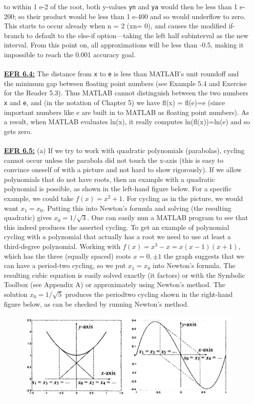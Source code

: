 \documentclass[../main.tex]{subfiles}
\begin{document}
to within 1 e-2 of the root, both y-values \texttt{yn} and \texttt{ya} would then be less than 1 e-200; so their product 
would be less than 1 e-400 and so would underflow to zero. This starts to occur already when n = 2 (xn= 0), and causes the modified if-branch to default to the else-if option—taking the left half subinterval 
as the new interval. From this point on, all approximations will be less than -0.5, making it impossible 
to reach the 0.001 accuracy goal.
\\
\\
\textbf{\underline{EFR 6.4:}} The distance from \texttt{x} to \texttt{e} is less than MATLAB's unit roundoff and the minimum gap 
between floating point numbers (see Example 5.4 and Exercise for the Reader 5.3). Thus MATLAB 
cannot distinguish between the two numbers \texttt{x} and \texttt{e}, and (in the notation of Chapter 5) we have fl(x) 
= fl(e)=e (since important numbers like e are built in to MATLAB as floating point numbers). As a 
result, when MATLAB evaluates ln(x), it really computes ln(fl(x))=ln(e) and so gets zero. 
\\
\\
\textbf{\underline{EFR 6.5:}} (a) If we try to work with quadratic polynomials (parabolas), cycling cannot occur unless 
the parabola did not touch the x-axis (this is easy to convince oneself of with a picture and not hard to 
show rigorously). If we allow polynomials that do not have roots, then an example with a quadratic 
polynomial is possible, as shown in the left-hand figure below. For a specific example, we could take $f(x)=x^{2}+1$. For cycling as in the picture, we would want $x_{1}=x_{0}$. Putting this into Newton's formula and solving (the resulting quadratic) gives $x_{0}=1 / \sqrt{3}$. One can easily nun a MATLAB program to see that this indeed produces the asserted cycling. To get an example of polynomial cycling with a polynomial that actually has a root we need to use at least a third-degree polynomial. Working with $f(x)=x^{3}-x=x(x-1)(x+1)$, which has the three (equally spaced) roots $x=0, \pm 1$ the graph suggests that we can have a period-two cycling, so we put $x_{1}=x_{0}$ into Newton's formula. The resulting cubic equation is easily solved exactly (it factors) or with the Symbolic Toolbox (see Appendix A) or approximately using Newton's method. The solution $x_{0}=1 / \sqrt{5}$ produces the periodtwo cycling shown in the right-hand figure below, as can be checked by running Newton's method.
\begin{figure}[H]
\includegraphics[width=0.9\linewidth]{42}
	\centering
	\label{pfig:ch13_42}
\end{figure}
\end{document}
